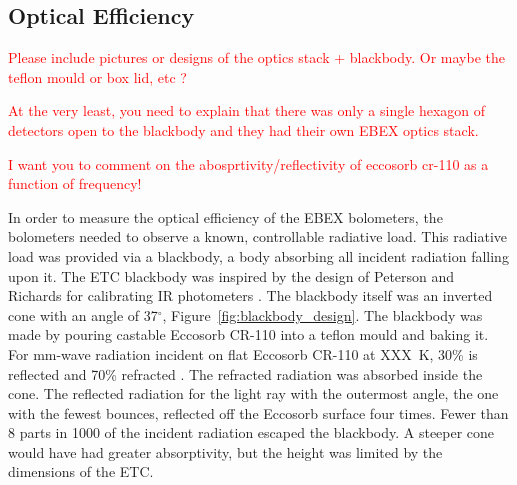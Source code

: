 \subsection{Optical Efficiency}
\label{sec:optical_efficiency}

%

\textcolor{red}{Please include pictures or designs of the optics stack + blackbody. Or maybe the teflon mould or box lid, etc ?}

\textcolor{red}{At the very least, you need to explain that there was only a single hexagon of detectors open to the blackbody and they had their own EBEX optics stack.}


\textcolor{red}{I want you to comment on the abosprtivity/reflectivity of eccosorb cr-110 as a function of frequency!}

In order to measure the optical efficiency of the \ac{EBEX} bolometers, the bolometers needed to observe a known, controllable radiative load.
This radiative load was provided via a blackbody, a body absorbing all incident radiation falling upon it. 
The \ac{ETC} blackbody was inspired by the design of Peterson and Richards for calibrating IR photometers \cite{Peterson1984a}. 
The blackbody itself was an inverted cone with an angle of 37$^{\circ}$, Figure~\ref{fig:blackbody_design}. 
The blackbody was made by pouring castable Eccosorb CR-110 into a teflon mould and baking it.
For mm-wave radiation incident on flat Eccosorb CR-110 at XXX~K, 30\% is reflected and 70\% refracted \cite{}.
The refracted radiation was absorbed inside the cone. 
The reflected radiation for the light ray with the outermost angle, the one with the fewest bounces,  
reflected off the Eccosorb surface four times.
Fewer than 8 parts in 1000 of the incident radiation escaped the blackbody. 
A steeper cone would have had greater absorptivity, but the height was limited by the dimensions of the \ac{ETC}. 

